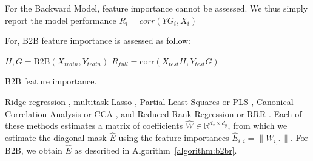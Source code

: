 For the Backward Model, feature importance cannot be assessed. We thus simply
report the model performance $R_i = corr(YG_i, X_i)$

For, B2B feature importance is assessed as follow:


\begin{algorithm}[H]
      $H, G = \text{B2B}(X_{train}, Y_{train})$\;
$R_{full} = \text{corr}(X_{test} H, Y_{test} G)$\;

 \caption{B2B feature importance.} \label{algorithm:b2b_fi}
\end{algorithm}

\iffalse Ridge regression \citep{hoerl1959optimum}, multitask Lasso
\citep{argyriou2008convex}, Partial Least Squares or PLS \citep{wold_pls,
tenenhaus_pls}, Canonical Correlation Analysis or CCA \citep{cca_hotelling}, and
Reduced Rank Regression or RRR \citep{Izenman_rrr}.
%
Each of these methods estimates a matrix of coefficients $\hat{W} \in
\mathbb{R}^{d_x \times d_y}$, from which we estimate the diagonal mask $\hat{E}$
using the feature importances $\hat{E}_{i,i} = \| W_{i, :} \|$.
%
For B2B, we obtain $\hat{E}$ as described in Algorithm~\ref{algorithm:b2br}.
%


